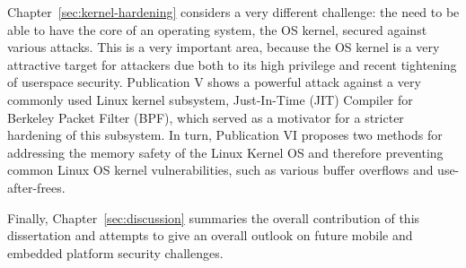 Chapter~\ref{sec:kernel-hardening} considers a very different challenge: the need to be able to have the core of an operating system, the OS kernel, secured against various attacks. This is a very important area, because the OS kernel is a very attractive target for attackers due both to its high privilege and recent tightening of userspace security. Publication V shows a powerful attack against a very commonly used Linux kernel subsystem, Just-In-Time (JIT) Compiler for Berkeley Packet Filter (BPF), which served as a motivator for a stricter hardening of this subsystem. In turn, Publication VI proposes two methods for addressing the memory safety of the Linux Kernel OS and therefore preventing common Linux OS kernel vulnerabilities, such as various buffer overflows and use-after-frees. 

Finally, Chapter~\ref{sec:discussion} summaries the overall contribution of this dissertation and attempts to give an overall outlook on future mobile and embedded platform security challenges. 

